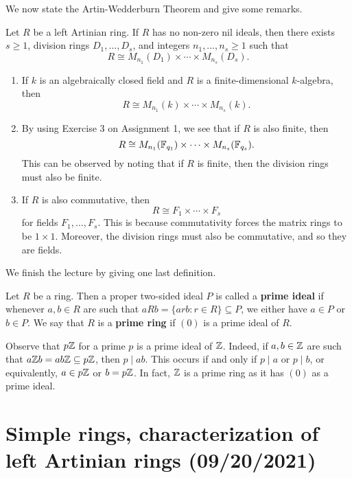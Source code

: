 We now state the Artin-Wedderburn Theorem and give some remarks. 

\begin{theo}{}
Let $R$ be a left Artinian ring. If $R$ has no non-zero nil ideals, then there exists $s \geq 1$, 
division rings $D_1, \dots, D_s$, and integers $n_1, \dots, n_s \geq 1$ such that 
\[ R \cong M_{n_1}(D_1) \times \cdots \times M_{n_s}(D_s). \]
\end{theo}

\begin{remark}{}
\begin{enumerate}[(1)]
    \item If $k$ is an algebraically closed field and $R$ is a finite-dimensional $k$-algebra, then 
    \[ R \cong M_{n_1}(k) \times \cdots \times M_{n_s}(k). \]
    \item By using Exercise 3 on Assignment 1, we see that if $R$ is also finite, then 
    \[ R \cong M_{n_1}(\mathbb{F}_{q_1}) \times \cdots \times M_{n_s}(\mathbb{F}_{q_s}). \]
    This can be observed by noting that if $R$ is finite, then the division rings must also be finite. 
    \item If $R$ is also commutative, then 
    \[ R \cong F_1 \times \cdots \times F_s \]
    for fields $F_1, \dots, F_s$. This is because commutativity forces the matrix rings to be 
    $1 \times 1$. Moreover, the division rings must also be commutative, and so they are fields.
\end{enumerate}
\end{remark}

We finish the lecture by giving one last definition. 

\begin{defn}{}
Let $R$ be a ring. Then a proper two-sided ideal $P$ is called a {\bf prime ideal} if whenever $a, b \in R$
are such that $aRb = \{arb : r \in R\} \subseteq P$, we either have $a \in P$ or $b \in P$.
We say that $R$ is a {\bf prime ring} if $(0)$ is a prime ideal of $R$. 
\end{defn}

\begin{exmp}{}
Observe that $p\mathbb{Z}$ for a prime $p$ is a prime ideal of $\mathbb{Z}$. Indeed, if $a, b \in \mathbb{Z}$ are such that 
$a\mathbb{Z} b = ab\mathbb{Z} \subseteq p\mathbb{Z}$, then $p \mid ab$. This occurs if and only if $p \mid a$ or $p \mid b$, 
or equivalently, $a \in p\mathbb{Z}$ or $b = p\mathbb{Z}$. In fact, $\mathbb{Z}$ is a prime ring as it has $(0)$ as a prime 
ideal. 
\end{exmp}

\section{Simple rings, characterization of left Artinian rings (09/20/2021)}

